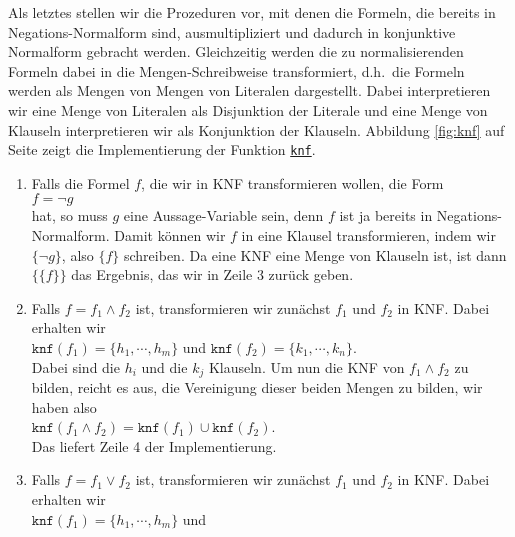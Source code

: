 Als letztes stellen wir die Prozeduren vor, mit denen die Formeln, die bereits in
Negations-Normalform sind, ausmultipliziert und dadurch in konjunktive
Normalform gebracht werden.  Gleichzeitig werden  die zu normalisierenden Formeln dabei
in die Mengen-Schreibweise transformiert, d.h.~die Formeln werden als Mengen von Mengen 
von Literalen dargestellt.  Dabei interpretieren wir eine Menge von Literalen als
Disjunktion der Literale und eine Menge von Klauseln interpretieren wir als Konjunktion
der Klauseln.
Abbildung \ref{fig:knf} auf Seite \pageref{fig:knf} zeigt die Implementierung der Funktion
\href{https://github.com/karlstroetmann/Logik/blob/master/SetlX/knf.stlx}{\texttt{knf}}.
\begin{enumerate}
\item Falls die Formel $f$, die wir in KNF transformieren wollen, die Form \\[0.2cm]
      \hspace*{1.3cm} $f = \neg g$ \\[0.2cm]
      hat, so muss $g$ eine Aussage-Variable sein, denn $f$ ist ja bereits in
      Negations-Normalform.  Damit k\"{o}nnen wir $f$ in eine Klausel transformieren, 
      indem wir $\{\neg g\}$, also $\{f\}$ schreiben.  
      Da eine KNF eine Menge von Klauseln ist, ist dann 
      $\bigl\{\{f\}\bigr\}$ das Ergebnis, das wir in Zeile 3 zur\"{u}ck geben.
\item Falls $f= f_1 \wedge f_2$ ist, transformieren wir zun\"{a}chst $f_1$ und $f_2$ in KNF.
      Dabei erhalten wir \\[0.2cm]
      \hspace*{1.3cm} 
      $\mathtt{knf}(f_1) = \{ h_1, \cdots, h_m \}$ \quad und \quad
      $\mathtt{knf}(f_2) = \{ k_1, \cdots, k_n \}$. \\[0.2cm]
      Dabei sind die $h_i$ und die $k_j$ Klauseln.  Um nun die KNF von $f_1 \wedge f_2$ 
      zu bilden, reicht es aus, die Vereinigung dieser beiden Mengen zu bilden,
      wir haben also \\[0.2cm]
      \hspace*{1.3cm} $\mathtt{knf}(f_1 \wedge f_2) = \mathtt{knf}(f_1) \cup  \mathtt{knf}(f_2)$.
      \\[0.2cm]
      Das liefert Zeile 4 der Implementierung.
\item Falls $f= f_1 \vee f_2$ ist, transformieren wir zun\"{a}chst $f_1$ und $f_2$ in KNF.
      Dabei erhalten wir \\[0.2cm]
      \hspace*{1.3cm} 
      $\mathtt{knf}(f_1) = \{ h_1, \cdots, h_m \}$ \quad und \quad

\end{enumerate}
